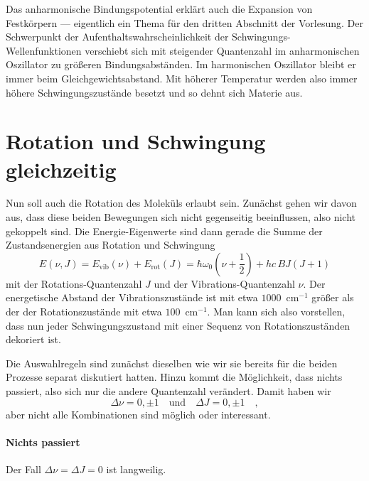  
 
Das anharmonische Bindungspotential erklärt auch die Expansion von Festkörpern --- eigentlich ein Thema für den dritten Abschnitt der Vorlesung. Der Schwerpunkt der Aufenthaltswahrscheinlichkeit der Schwingungs-Wellenfunktionen verschiebt sich mit steigender Quantenzahl im anharmonischen Oszillator zu größeren Bindungsabständen. Im harmonischen Oszillator bleibt er immer beim Gleichgewichtsabstand. Mit höherer Temperatur werden also immer höhere Schwingungszustände besetzt und so dehnt sich Materie aus.


\section{Rotation und Schwingung gleichzeitig}

Nun soll auch die Rotation des Moleküls erlaubt sein. Zunächst gehen wir davon aus, dass diese beiden Bewegungen sich nicht gegenseitig beeinflussen, also nicht gekoppelt sind. Die Energie-Eigenwerte sind dann gerade die Summe der Zustandsenergien aus Rotation und Schwingung%
\begin{equation}
E (\nu, J) = E_\text{vib}(\nu) + E_\text{rot}(J) = \hbar \omega_0 \left(\nu + \frac{1}{2} \right) + h c \, B J \left( J+1 \right) \label{eq:vib_rot_simple}
\end{equation}
mit der Rotations-Quantenzahl $J$ und der Vibrations-Quantenzahl $\nu$. Der energetische Abstand der Vibrationszustände ist mit etwa $1000$~cm$^{-1}$  größer als der der Rotationszustände mit etwa $100$~cm$^{-1}$. Man kann sich also vorstellen, dass nun jeder Schwingungszustand mit einer Sequenz von Rotationszuständen dekoriert ist.

Die Auswahlregeln sind zunächst dieselben wie wir sie bereits für die beiden Prozesse separat diskutiert hatten. Hinzu kommt die Möglichkeit, dass nichts passiert, also sich nur die andere Quantenzahl verändert. Damit haben wir
\begin{equation}
 \Delta \nu = 0, \pm 1 \quad \text{und} \quad \Delta J = 0, \pm 1  \quad ,
\end{equation}
aber nicht alle Kombinationen sind möglich oder interessant.

\paragraph{Nichts passiert} Der Fall $\Delta \nu = \Delta J = 0$ ist langweilig.

